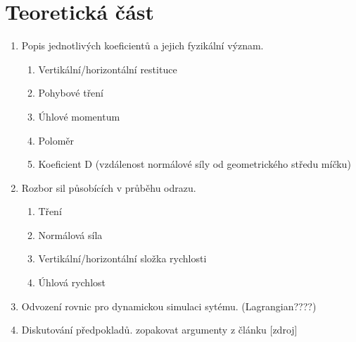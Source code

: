 \part{Teoretická část}
\label{part:teoreticka-cast}

\begin{enumerate}
 \item Popis jednotlivých koeficientů a jejich fyzikální význam.
 \begin{enumerate}
  \item Vertikální/horizontální restituce
  \item Pohybové tření
  \item Úhlové momentum
  \item Poloměr
  \item Koeficient D (vzdálenost normálové síly od geometrického středu míčku)
 \end{enumerate}
 \item Rozbor sil působících v průběhu odrazu.
 \begin{enumerate}
  \item Tření
  \item Normálová síla
  \item Vertikální/horizontální složka rychlosti
  \item Úhlová rychlost
 \end{enumerate} 
 \item Odvození rovnic pro dynamickou simulaci sytému. (Lagrangian????)
 \item Diskutování předpokladů. zopakovat argumenty z článku [zdroj]
\end{enumerate}

